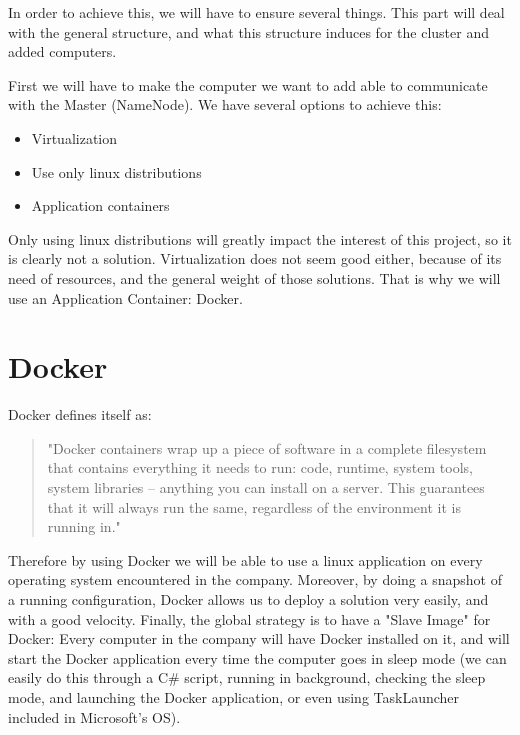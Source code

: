 \documentclass[11pt]{report} %
\begin{document}
In order to achieve this, we will have to ensure several things. This part will deal with the general structure, and what this structure induces for the cluster and added computers.

First we will have to make the computer we want to add able to communicate with the Master (NameNode). We have several options to achieve this: \begin{itemize}
\item Virtualization
\item Use only linux distributions
\item Application containers
\end{itemize}
Only using linux distributions will greatly impact the interest of this project, so it is clearly not a solution. Virtualization does not seem good either, because of its need of resources, and the general weight of those solutions. That is why we will use an Application Container: Docker.

\section{Docker}
Docker defines itself as: \begin{quote}"Docker containers wrap up a piece of software in a complete filesystem that contains everything it needs to run: code, runtime, system tools, system libraries – anything you can install on a server. This guarantees that it will always run the same, regardless of the environment it is running in."\end{quote}

Therefore by using Docker we will be able to use a linux application on every operating system encountered in the company.
Moreover, by doing a snapshot of a running configuration, Docker allows us to deploy a solution very easily, and with a good velocity.
Finally, the global strategy is to have a "Slave Image" for Docker:
Every computer in the company will have Docker installed on it, and will start the Docker application every time the computer goes in sleep mode (we can easily do this through a C\# script, running in background, checking the sleep mode, and launching the Docker application, or even using TaskLauncher included in Microsoft's OS).
\end{document}
